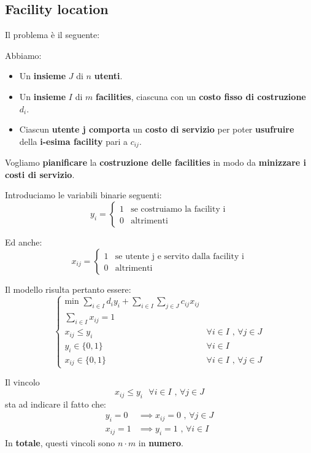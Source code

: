 \subsection{Facility location}

Il problema è il seguente:

\begin{exa}
    Abbiamo:
    \begin{itemize}
        \item Un \textbf{insieme} $J$ di $n$ \textbf{utenti}.
        \item Un \textbf{insieme} $I$ di $m$ \textbf{facilities}, ciascuna
            con un \textbf{costo fisso di costruzione} $d_i$.
        \item Ciascun \textbf{utente j comporta} un \textbf{costo di servizio}
            per poter \textbf{usufruire} della \textbf{i-esima facility} 
            pari a $c_{ij}$.
    \end{itemize}
    Vogliamo \textbf{pianificare} la \textbf{costruzione delle facilities}
    in modo da \textbf{minizzare i costi di servizio}.
\end{exa}

Introduciamo le variabili binarie seguenti:
\[
    y_i = \begin{cases}
        1 & \text{se costruiamo la facility i} \\ 
        0 & \text{altrimenti}
    \end{cases}
\]

Ed anche:
\[
    x_{ij} = \begin{cases}
        1 & \text{se utente j e servito dalla facility i} \\ 
        0 & \text{altrimenti}
    \end{cases}
\]

Il modello risulta pertanto essere:
\[
    \begin{cases}
        \text{min } \displaystyle\sum_{i\in I} d_i y_i + 
        \sum_{i \in I} \displaystyle\sum_{j \in J} c_{ij} x_{ij} \\ 
        \sum_{i \in I} x_{ij} = 1 \\ 
        x_{ij} \le y_i & \forall i \in I \text{ , } \forall j \in J \\
        y_i \in \{0,1\} & \forall i \in I \\ 
        x_{ij} \in \{0,1\} & \forall i \in I \text{ , } \forall j \in J  
    \end{cases}
\]

\begin{remark}[VINCOLI]
    Il vincolo
    \[
        x_{ij} \le y_i \text{ } \forall i \in I \text{ , } \forall j \in J
    \] 
    sta ad indicare il fatto che:
    \[
        \begin{aligned}
            y_i = 0 &\implies x_{ij} = 0 \text{ , } \forall j \in J \\ 
            x_{ij} = 1 &\implies y_i = 1 \text{ , } \forall i \in I
        \end{aligned}
    \] 
    In \textbf{totale}, questi vincoli sono $n \cdot m$ in \textbf{numero}.
\end{remark}


